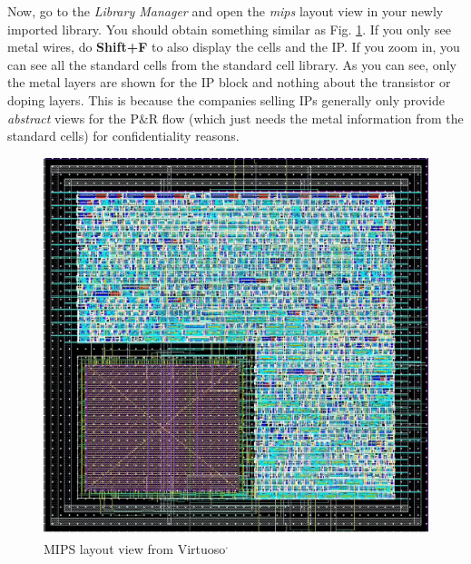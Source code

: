 Now, go to the \textit{Library Manager} and open the \textit{mips} layout view in your newly imported library. You should obtain something similar as Fig. \ref{mips_virtuoso}. If you only see metal wires, do \textbf{Shift+F} to also display the cells and the IP. If you zoom in, you can see all the standard cells from the standard cell library. As you can see, only the metal layers are shown for the IP block and nothing about the transistor or doping layers. This is because the companies selling IPs generally only provide \textit{abstract} views for the P$\&$R flow (which just needs the metal information from the standard cells) for confidentiality reasons.
\begin{figure}[!h]
	\centering
	\includegraphics[scale=0.4]{figures/lab5_backend/mips_virtuoso}
	\caption{MIPS layout view from Virtuoso\textsuperscript{\tiny\textregistered.}}
	\label{mips_virtuoso}
\end{figure}
			\vspace{-6mm}

